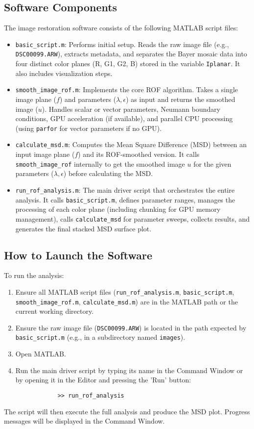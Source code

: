 \documentclass{article}
\begin{document}
	\subsection{Software Components}
	The image restoration software consists of the following MATLAB script files:
	\begin{itemize}
		\item \texttt{basic\_script.m}: Performs initial setup. Reads the raw image file (e.g., \texttt{DSC00099.ARW}), extracts metadata, and separates the Bayer mosaic data into four distinct color planes (R, G1, G2, B) stored in the variable \texttt{Iplanar}. It also includes visualization steps.
		\item \texttt{smooth\_image\_rof.m}: Implements the core ROF algorithm. Takes a single image plane ($f$) and parameters ($\lambda, \epsilon$) as input and returns the smoothed image ($u$). Handles scalar or vector parameters, Neumann boundary conditions, GPU acceleration (if available), and parallel CPU processing (using \texttt{parfor} for vector parameters if no GPU).
		\item \texttt{calculate\_msd.m}: Computes the Mean Square Difference (MSD) between an input image plane ($f$) and its ROF-smoothed version. It calls \texttt{smooth\_image\_rof} internally to get the smoothed image $u$ for the given parameters ($\lambda, \epsilon$) before calculating the MSD.
		\item \texttt{run\_rof\_analysis.m}: The main driver script that orchestrates the entire analysis. It calls \texttt{basic\_script.m}, defines parameter ranges, manages the processing of each color plane (including chunking for GPU memory management), calls \texttt{calculate\_msd} for parameter sweeps, collects results, and generates the final stacked MSD surface plot.
	\end{itemize}
	
	\subsection{How to Launch the Software}
	To run the analysis:
	\begin{enumerate}
		\item Ensure all MATLAB script files (\texttt{run\_rof\_analysis.m}, \texttt{basic\_script.m}, \texttt{smooth\_image\_rof.m}, \texttt{calculate\_msd.m}) are in the MATLAB path or the current working directory.
		\item Ensure the raw image file (\texttt{DSC00099.ARW}) is located in the path expected by \texttt{basic\_script.m} (e.g., in a subdirectory named \texttt{images}).
		\item Open MATLAB.
		\item Run the main driver script by typing its name in the Command Window or by opening it in the Editor and pressing the 'Run' button:
		\begin{verbatim}
			>> run_rof_analysis
		\end{verbatim}
	\end{enumerate}
	The script will then execute the full analysis and produce the MSD plot. Progress messages will be displayed in the Command Window.
	
\end{document}
